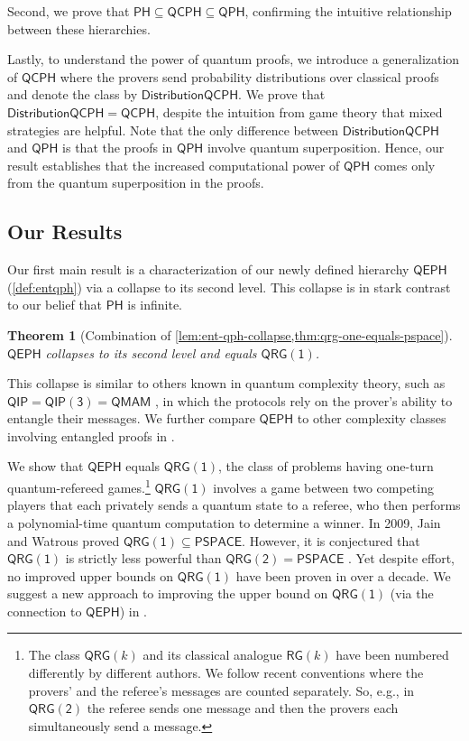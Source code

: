 \documentclass[11pt]{article}
\newtheorem{theorem}{Theorem}[section]
\theoremstyle{definition}
\newcommand{\class}[1]{\ensuremath{\mathsf{#1}}\xspace}
\newcommand{\PSPACE}{\class{PSPACE}}
\newcommand{\QIP}{\class{QIP}}
\newcommand{\QIPk}[1][k]{\class{QIP(#1)}}
\newcommand{\QRG}{\class{QRG}}
\newcommand{\QRGk}[1][k]{\class{QRG(#1)}}
\newcommand{\QRGone}{\QRGk[1]}
\newcommand{\QRGtwo}{\QRGk[2]}
\newcommand{\RG}{\class{RG}}
\newcommand{\QMAM}{\class{QMAM}}
\newcommand{\PH}{\class{PH}}
\newcommand{\QCPH}{\class{QCPH}}
\newcommand{\QPH}{\class{QPH}}
\newcommand{\QEPH}{\class{QEPH}}
\newcommand{\distributionQCPH}{\mathsf{DistributionQCPH}}
\begin{document}
Second, we prove that $\PH \subseteq \QCPH \subseteq \QPH$, 
confirming the intuitive relationship between these hierarchies. 

Lastly, to understand the power of quantum proofs, we introduce a generalization of $\QCPH$ where the provers send probability distributions over classical proofs and denote the class by $\distributionQCPH$. 
We prove that $\distributionQCPH = \QCPH$, despite the intuition from game theory that mixed strategies are helpful.
Note that the only difference between $\distributionQCPH$ and $\QPH$ is that the proofs in $\QPH$ involve quantum superposition.
Hence, our result establishes that the increased computational power of $\QPH$ comes only from the quantum superposition in the proofs. 


\subsection{Our Results}

Our first main result is a characterization of our newly defined hierarchy $\QEPH$ (\cref{def:entqph}) via a collapse to its second level. This collapse is in stark contrast to our belief that $\PH$ is infinite.

\begin{theorem}[Combination of \cref{lem:ent-qph-collapse,thm:qrg-one-equals-pspace}] 
$\QEPH$ collapses to its second level and equals $\QRGone$.
\end{theorem}


This collapse is similar to others known in quantum complexity theory, such as $\QIP = \QIPk[3] = \QMAM$ \cite{kitaev2000parallelization,marriott2005quantum}, 
in which the protocols rely on the prover's ability to entangle their messages.
We further compare $\QEPH$ to other complexity classes involving entangled proofs in .

We show that $\QEPH$ equals $\QRGone$, the class of problems having one-turn quantum-refereed games.\footnote{The class $\QRG(k)$ and its classical analogue $\RG(k)$ have been numbered differently by different authors. We follow recent conventions
where the provers' and the referee's messages are counted separately.
So, e.g., in $\QRGtwo$ the referee sends one message and then the provers each simultaneously send a message.}
$\QRGone$ involves a game between two competing players that each privately sends a quantum state to a referee, who then performs a polynomial-time quantum computation to determine a winner.
In 2009, Jain and Watrous \cite{jain2009parallel} proved $\QRGone \subseteq \PSPACE$. 
However, it is conjectured that $\QRGone$ is strictly less powerful than $\QRGtwo=\PSPACE$ \cite{gutoski2013parallel,ghosh2023complexity}. 
Yet despite effort, no improved upper bounds on $\QRGone$ have been proven in over a decade. 
We suggest a new approach to improving the upper bound on $\QRGone$ (via the connection to $\QEPH$) in .
\end{document}
